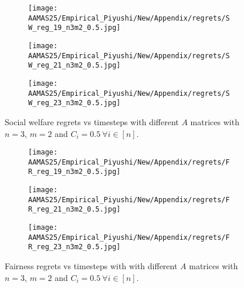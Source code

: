 \begin{figure*}[ht!]
\centering
\begin{subfigure}{.33\textwidth}
    \centering
    \texttt{[image: AAMAS25/Empirical\_Piyushi/New/Appendix/regrets/SW\_reg\_19\_n3m2\_0.5.jpg]}  
\end{subfigure}  
\begin{subfigure}{.33\textwidth}
    \centering
    \texttt{[image: AAMAS25/Empirical\_Piyushi/New/Appendix/regrets/SW\_reg\_21\_n3m2\_0.5.jpg]}  
\end{subfigure}  
\begin{subfigure}{.33\textwidth}
    \centering
    \texttt{[image: AAMAS25/Empirical\_Piyushi/New/Appendix/regrets/SW\_reg\_23\_n3m2\_0.5.jpg]}  
\end{subfigure}  
\caption{Social welfare regrets vs timesteps with different $A$ matrices with $n=3$, $m=2$ and $C_i=0.5\ \forall i \in [n]$.}\label{app:sw_32_0.5}
\end{figure*} 

\begin{figure*}[ht!]
\centering
\begin{subfigure}{.33\textwidth}
    \centering
    \texttt{[image: AAMAS25/Empirical\_Piyushi/New/Appendix/regrets/FR\_reg\_19\_n3m2\_0.5.jpg]}  
\end{subfigure}  
\begin{subfigure}{.33\textwidth}
    \centering
    \texttt{[image: AAMAS25/Empirical\_Piyushi/New/Appendix/regrets/FR\_reg\_21\_n3m2\_0.5.jpg]}  
\end{subfigure}  
\begin{subfigure}{.33\textwidth}
    \centering
    \texttt{[image: AAMAS25/Empirical\_Piyushi/New/Appendix/regrets/FR\_reg\_23\_n3m2\_0.5.jpg]}  
\end{subfigure}  
\caption{Fairness regrets vs timesteps with with different $A$ matrices with $n=3$, $m=2$ and $C_i=0.5\ \forall i \in [n]$.}\label{app:fr_32_0.5}
\end{figure*} 


